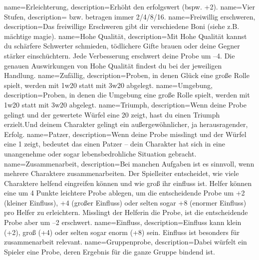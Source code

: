 {
    name={Erleichterung},
    description={Erhöht den \gls{erfolgswert} (bspw. +2).}}
{
    name={Vier Stufen},
    description={ bzw.  betragen immer 2/4/8/16.}}
{
    name={Freiwillig erschweren},
    description={Das freiwillige Erschweren gibt dir verschiedene Boni (siehe z.B. \gls{mächtige magie}).}}
{
    name={Hohe Qualität},
    description={Mit Hohe Qualität kannst du schärfere Schwerter schmieden, tödlichere Gifte brauen oder deine Gegner stärker \gls{einschüchtern}. Jede Verbesserung erschwert deine Probe um –4. Die genauen Auswirkungen von Hohe Qualität findest du bei der jeweiligen Handlung.}}
{
    name={Zufällig},
    description={Proben, in denen Glück eine große Rolle spielt, werden mit \gls{1w20} statt mit \gls{3w20} abgelegt.}}
{
    name={Umgebung},
    description={Proben, in denen die Umgebung eine große Rolle spielt, werden mit \gls{1w20} statt mit \gls{3w20} abgelegt.}}
{
    name={Triumph},
    description={Wenn deine Probe gelingt und der gewertete Würfel eine 20 zeigt, hast du einen Triumph erzielt.Und deinem Charakter gelingt ein außergewöhnlicher, ja herausragender, Erfolg.}}
{
    name={Patzer},
    description={Wenn deine Probe misslingt und der Würfel eine 1 zeigt, bedeutet das einen Patzer – dein Charakter hat sich in eine unangenehme oder sogar lebensbedrohliche Situation gebracht.}}
{
    name={Zusammenarbeit},
    description={Bei manchen Aufgaben ist es sinnvoll, wenn mehrere Charaktere zusammenarbeiten. Der Spielleiter entscheidet,
wie viele Charaktere helfend eingreifen können und wie groß ihr \gls{einfluss} ist. Helfer können eine um 4 Punkte leichtere Probe ablegen, um die entscheidende Probe um +2 (kleiner Einfluss), +4 (großer Einfluss) oder selten sogar +8 (enormer Einfluss) pro Helfer zu erleichtern. Misslingt der Helferin die Probe, ist die entscheidende Probe aber um –2 erschwert.}}
{
    name={Einfluss},
    description={Einfluss kann klein (+2), groß (+4) oder selten sogar enorm (+8) sein. Einfluss ist besonders für \gls{zusammenarbeit} relevant.}}
{
    name={Gruppenprobe},
    description={Dabei würfelt ein Spieler eine Probe, deren Ergebnis für die ganze Gruppe bindend ist.}}

